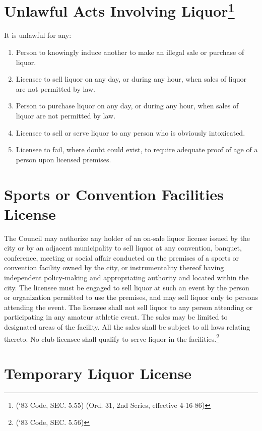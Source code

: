 \section{Unlawful Acts Involving Liquor\footnote{(‘83 Code, SEC. 5.55)  (Ord. 31, 2nd Series, effective 4-16-86)}}
It is unlawful for any:
\begin{enumerate}[{\indent}A)]
    \item Person to knowingly induce another to make an illegal sale or purchase of liquor.
    \item Licensee to sell liquor on any day, or during any hour, when sales of liquor are not permitted by law.
    \item Person to purchase liquor on any day, or during any hour, when sales of liquor are not permitted by law.
    \item Licensee to sell or serve liquor to any person who is obviously intoxicated.
    \item Licensee to fail, where doubt could exist, to require adequate proof of age of a person upon licensed premises.
\end{enumerate}

\section{Sports or Convention Facilities License}
The Council may authorize any holder of an on-sale liquor license issued by the city or by an adjacent municipality to sell liquor at any convention, banquet, conference, meeting or social affair conducted on the premises of a sports or convention facility owned by the city, or instrumentality thereof having independent policy-making and appropriating authority and located within the city.  The licensee must be engaged to sell liquor at such an event by the person or organization permitted to use the premises, and may sell liquor only to persons attending the event.  The licensee shall not sell liquor to any person attending or participating in any amateur athletic event.  The sales may be limited to designated areas of the facility.  All the sales shall be subject to all laws relating thereto.  No club licensee shall qualify to serve liquor in the facilities.\footnote{(‘83 Code, SEC. 5.56)}

\section{Temporary Liquor License}
